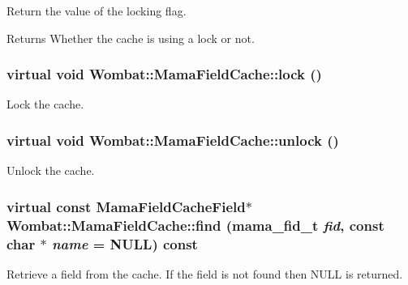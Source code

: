 Return the value of the locking flag. \begin{DoxyReturn}{Returns}
Whether the cache is using a lock or not. 
\end{DoxyReturn}
\hypertarget{classWombat_1_1MamaFieldCache_aa6b7b3ec3994c45c88736819bc903679}{
\subsubsection[{lock}]{\setlength{\rightskip}{0pt plus 5cm}virtual void Wombat::MamaFieldCache::lock ()}}
\label{classWombat_1_1MamaFieldCache_aa6b7b3ec3994c45c88736819bc903679}


Lock the cache. \hypertarget{classWombat_1_1MamaFieldCache_ad893a423af9d5b07eb6f27ad482885d7}{
\subsubsection[{unlock}]{\setlength{\rightskip}{0pt plus 5cm}virtual void Wombat::MamaFieldCache::unlock ()}}
\label{classWombat_1_1MamaFieldCache_ad893a423af9d5b07eb6f27ad482885d7}


Unlock the cache. \hypertarget{classWombat_1_1MamaFieldCache_af8011dde43b855c372cb734f69a77025}{
\subsubsection[{find}]{\setlength{\rightskip}{0pt plus 5cm}virtual const {\bf MamaFieldCacheField}$\ast$ Wombat::MamaFieldCache::find (mama\_\-fid\_\-t {\em fid}, \/  const char $\ast$ {\em name} = {\ttfamily NULL}) const}}
\label{classWombat_1_1MamaFieldCache_af8011dde43b855c372cb734f69a77025}


Retrieve a field from the cache. If the field is not found then NULL is returned.



